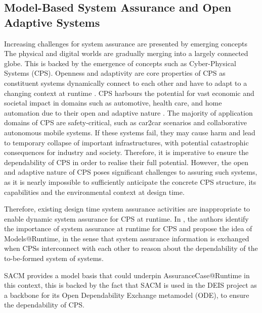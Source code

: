 \subsection{Model-Based System Assurance and Open Adaptive  Systems}
Increasing challenges for system assurance are presented by emerging concepts 
The physical and digital worlds are gradually merging into a largely connected globe. 
This is backed by the emergence of concepts such as Cyber-Physical Systems (CPS).
Openness and adaptivity are core properties of CPS as constituent systems dynamically connect to each other and have to adapt to a changing context at runtime \cite{trapp2013safety}.
CPS harbours the potential for vast economic and societal impact in domains such as automotive, health care, and home automation due to their open and adaptive nature \cite{wei2017deis}.
The majority of application domains of CPS are safety-critical, such as car2car scenarios and collaborative autonomous mobile systems.
If these systems fail, they may cause harm and lead to temporary collapse of important infrastructures, with potential catastrophic consequences for industry and society.
Therefore, it is imperative to ensure the dependability of CPS in order to realise their full potential. 
However, the open and adaptive nature of CPS poses significant challenges to assuring such systems, as it is nearly impossible to sufficiently anticipate the concrete CPS structure, its capabilities and the environmental context at design time.

Therefore, existing design time system assurance activities are inappropriate to enable dynamic system assurance for CPS at runtime. 
In \cite{trapp2013safety}, the authors identify the importance of system assurance at runtime for CPS and propose the idea of Models@Runtime, in the sense that system assurance information is exchanged when CPSs interconnect with each other to reason about the dependability of the to-be-formed system of systems.

SACM provides a model basis that could underpin AssuranceCase@Runtime in this context, this is backed by the fact that SACM is used in the DEIS project \cite{wei2017deis} as a backbone for its Open Dependability Exchange metamodel (ODE), to ensure the dependability of CPS. 




